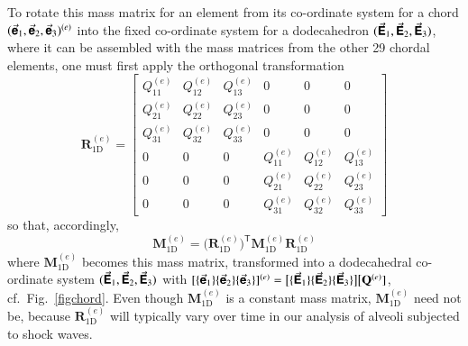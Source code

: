 To rotate this mass matrix for an element from its co-ordinate system for a chord $( \vec{\boldsymbol{\mathsf{e}}}_1 , \vec{\boldsymbol{\mathsf{e}}}_2 , \vec{\boldsymbol{\mathsf{e}}}_3 )^{(e)}$ into the fixed co-ordinate system for a dodecahedron $( \vec{\boldsymbol{\mathsf{E}}}_1 , \vec{\boldsymbol{\mathsf{E}}}_2 , \vec{\boldsymbol{\mathsf{E}}}_3 )$, where it can be assembled with the mass matrices from the other 29 chordal elements, one must first apply the orthogonal transformation
\begin{equation}
    \mathbf{R}^{(e)}_{\mathrm{1D}} = \left[ \begin{array}{ccc|ccc}
    Q^{(e)}_{11} & Q^{(e)}_{12} & Q^{(e)}_{13} & 0 & 0 & 0 \\
    Q^{(e)}_{21} & Q^{(e)}_{22} & Q^{(e)}_{23} & 0 & 0 & 0 \\
    Q^{(e)}_{31} & Q^{(e)}_{32} & Q^{(e)}_{33} & 0 & 0 & 0 \\ \hline
    0 & 0 & 0 & Q^{(e)}_{11} & Q^{(e)}_{12} & Q^{(e)}_{13} \\
    0 & 0 & 0 & Q^{(e)}_{21} & Q^{(e)}_{22} & Q^{(e)}_{23} \\
    0 & 0 & 0 & Q^{(e)}_{31} & Q^{(e)}_{32} & Q^{(e)}_{33} 
    \end{array} \right]
\end{equation}
so that, accordingly,
\begin{equation}
    \mathbf{M}^{(e)}_{\mathrm{1D}} = \bigl( \mathbf{R}^{(e)}_{\mathrm{1D}} \bigr)^{\mathsf{T}} 
    \boldsymbol{M}^{(e)}_{\mathrm{1D}} \mathbf{R}^{(e)}_{\mathrm{1D}}
\end{equation}
where $\mathbf{M}^{(e)}_{\mathrm{1D}}$ becomes this mass matrix, transformed into a dodecahedral co-ordinate system $( \vec{\boldsymbol{\mathsf{E}}}_1 , \vec{\boldsymbol{\mathsf{E}}}_2 , \vec{\boldsymbol{\mathsf{E}}}_3 )$ with $[ \{ \vec{\boldsymbol{\mathsf{e}}}_1 \} \{ \vec{\boldsymbol{\mathsf{e}}}_2 \} \{ \vec{\boldsymbol{\mathsf{e}}}_3 \} ]^{(e)} = \bigl[ \{ \vec{\boldsymbol{\mathsf{E}}}_1 \} \{ \vec{\boldsymbol{\mathsf{E}}}_2 \} \{ \vec{\boldsymbol{\mathsf{E}}}_3 \} \bigr] \bigl[ \mathbf{Q}^{(e)} ]$, cf.\ Fig.~\ref{figchord}.  Even though $\boldsymbol{M}^{(e)}_{\mathrm{1D}}$ is a constant mass matrix, $\mathbf{M}^{(e)}_{\mathrm{1D}}$ need not be, because $\mathbf{R}^{(e)}_{\mathrm{1D}}$ will typically vary over time in our analysis of alveoli subjected to shock waves.

